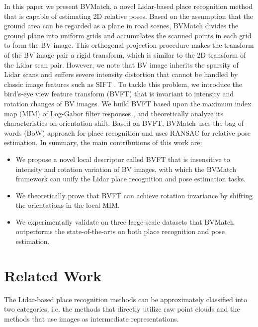 \documentclass[letterpaper, 10 pt, journal, twoside]{IEEEtran}
\begin{document}
In this paper we present BVMatch, a novel Lidar-based place recognition method that is capable of estimating 2D relative poses. Based on the assumption that the ground area can be regarded as a plane in road scenes, BVMatch divides the ground plane into uniform grids and accumulates the scanned points in each grid to form the BV image. This orthogonal projection procedure makes the transform of the BV image pair a rigid transform, which is similar to the 2D transform of the Lidar scan pair. However, we note that BV image inherits the sparsity of Lidar scans and suffers severe intensity distortion that cannot be handled by classic image features such as SIFT \cite{2004Distinctive}. {To tackle this problem, we introduce the bird's-eye view feature transform (BVFT) that is invariant to intensity and rotation changes of BV images. We build BVFT based upon the maximum index map (MIM) of Log-Gabor filter responses \cite{li2019rift}, and theoretically analyze its characteristics on orientation shift.} Based on BVFT, BVMatch uses the bag-of-words (BoW) approach for place recognition and uses RANSAC \cite{fischler1981random} for relative pose estimation. In summary, the main contributions of this work are:
{
\begin{itemize}
\item We propose a novel local descriptor called BVFT that is insensitive to intensity and rotation variation of BV images, with which the BVMatch framework can unify the Lidar place recognition and pose estimation tasks.
\item We theoretically prove that BVFT can achieve rotation invariance  by shifting the orientations in the local MIM.
\item We experimentally validate on three large-scale datasets that BVMatch outperforms the state-of-the-arts on both place recognition and pose estimation.
\end{itemize}
}


\section{Related Work}
The Lidar-based place recognition methods can be approximately classified into two categories, i.e. the methods that directly utilize raw point clouds and the methods that use images as intermediate representations.
\end{document}
